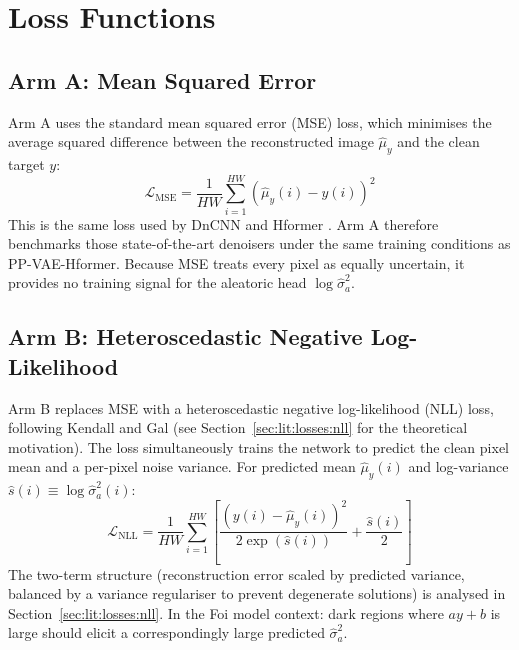 \documentclass[12pt, a4paper, twoside, openright]{book}
\begin{document}
\section{Loss Functions}
\label{sec:methods:loss}

\subsection{Arm A: Mean Squared Error}
\label{sec:methods:loss:mse}

Arm A uses the standard mean squared error (MSE) loss, which minimises the average
squared difference between the reconstructed image $\hat{\mu}_y$ and the clean target $y$:
\begin{equation}
\label{eq:methods:mse}
\mathcal{L}_{\mathrm{MSE}} = \frac{1}{HW}\sum_{i=1}^{HW}\left(\hat{\mu}_y(i) - y(i)\right)^2
\end{equation}
This is the same loss used by DnCNN \cite{zhang_beyond_2017} and Hformer
\cite{zhang_hformer_2023}. Arm A therefore benchmarks those state-of-the-art denoisers
under the same training conditions as PP-VAE-Hformer. Because MSE treats every pixel as
equally uncertain, it provides no training signal for the aleatoric head $\log\hat{\sigma}^2_a$.

\subsection{Arm B: Heteroscedastic Negative Log-Likelihood}
\label{sec:methods:loss:nll}

Arm B replaces MSE with a heteroscedastic negative log-likelihood (NLL) loss, following
Kendall and Gal \cite{kendall_what_2017} (see Section~\ref{sec:lit:losses:nll} for the
theoretical motivation). The loss simultaneously trains the network to predict the clean pixel
mean and a per-pixel noise variance. For predicted mean $\hat{\mu}_y(i)$ and
log-variance $\hat{s}(i) \equiv \log\hat{\sigma}^2_a(i)$:
\begin{equation}
\label{eq:methods:nll}
\mathcal{L}_{\mathrm{NLL}} = \frac{1}{HW}\sum_{i=1}^{HW}
  \left[\frac{\left(y(i) - \hat{\mu}_y(i)\right)^2}{2\exp\!\left(\hat{s}(i)\right)}
  + \frac{\hat{s}(i)}{2}\right]
\end{equation}
The two-term structure (reconstruction error scaled by predicted variance, balanced by a
variance regulariser to prevent degenerate solutions) is analysed in
Section~\ref{sec:lit:losses:nll}. In the Foi model context: dark regions where $ay+b$ is
large should elicit a correspondingly large predicted $\hat{\sigma}^2_a$.
\end{document}
